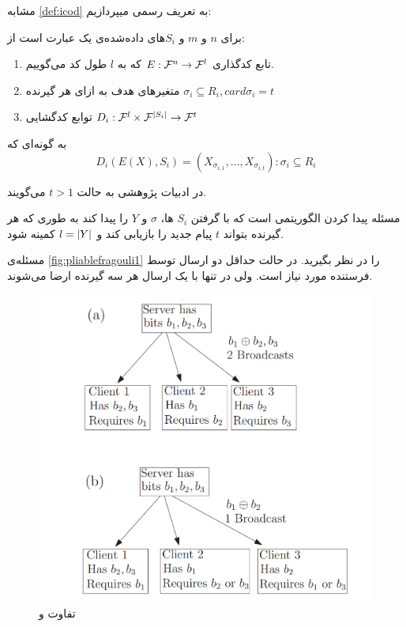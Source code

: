 	مشابه
	 \autoref{def:icod}
	 به تعریف رسمی
	 \picodt
	 میپردازیم:
\begin{definition}[\picodt]
	\label{def:picodt}
	برای
	$n$
	و
	$m$
	و
	$S_i$های 
 داده‌شده‌ی یک
	\picodt
	عبارت است از:
	\begin{enumerate}
		\item 
		تابع کدگذاری
		$E: \mathcal{F}^n \rightarrow \mathcal{F}^l$
		که به 
		$l$
		طول کد می‌گوییم.
		\item متغیرهای هدف به ازای هر گیرنده
		$\sigma_i \subseteq R_i,  card{\sigma_i} = t$
		\item 
		توابع کدگشایی 
		$D_i: \mathcal{F}^l \times \mathcal{F}^{\left|{S_i}\right|} \rightarrow \mathcal{F}^t$
	\end{enumerate}
	به گونه‌ای که
	$$D_i(E(X), S_i) = (X_{\sigma_{i,1}}, \ldots, X_{\sigma_{i,t}}): \sigma_i \subseteq R_i$$
\end{definition}

در ادبیات پژوهشی به حالت
$t > 1$
می‌گویند.

مسئله 
\picodt
پیدا کردن الگوریتمی است که با گرفتن 
$S_i$
ها،
$\sigma$
و
$Y$
را پیدا کند به طوری که هر گیرنده بتواند
$t$
پیام جدید را بازیابی کند و 
$l = \left|{Y}\right|$
کمینه شود.

\begin{remark}
مسئله‌ی 
\autoref{fig:pliablefragouli1}
را در نظر بگیرید. در حالت 
\icod
 حداقل دو ارسال توسط فرستنده مورد نیاز است. ولی در
 \picod
 تنها با یک ارسال هر سه گیرنده ارضا می‌شوند.
 \begin{figure}[H]
 	\centering
 	\includegraphics[width=0.6\linewidth]{figs/ch3/pliable_fragouli1}
 	\caption[تفاوت
 	\icod
 	و
 	\picod]{تفاوت
 		\icod
 		و
 		\picod
 		\cite{pliablefirstpaper}}
 	\label{fig:pliablefragouli1}
 \end{figure}
\end{remark}

